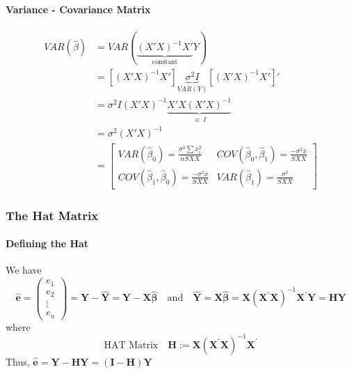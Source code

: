 \documentclass[10pt]{article}
\begin{document}
\paragraph{Variance - Covariance Matrix}
\begin{align*}
    VAR(\hat{\beta}) &= VAR( \underbrace{(X'X)^{-1}X'}_{\text{constant}}Y ) \\
    &= [(X'X)^{-1}X'] \underbrace{\sigma^2 I}_{VAR(Y)} [(X'X)^{-1}X']' \\
    &= \sigma^2 I (X'X)^{-1}  \underbrace{X'X (X'X)^{-1}}_{\equiv~I} \\
    &= \sigma^2 (X'X)^{-1} \\
    &=
    \begin{bmatrix}
        VAR(\hat{\beta}_0) =  \frac{\sigma^2\sum x_{i}^{2}}{n S X X}
        & COV(\hat{\beta}_0, \hat{\beta}_1) = \frac{-\sigma^2\bar{x}}{S X X} \\
        COV(\hat{\beta}_1, \hat{\beta}_0) = \frac{-\sigma^2\bar{x}}{S X X}
        & VAR(\hat{\beta}_1) = \frac{\sigma^2}{SXX}
    \end{bmatrix}
\end{align*}

\subsubsection{The Hat Matrix}
\paragraph{Defining the Hat}
We have
\begin{equation*}
    \widehat{\mathbf{e}}=\left(\begin{array}{c}{e_{1}} \\ {e_{2}} \\ {\vdots} \\ {e_{n}}\end{array}\right)=\mathbf{Y}-\widehat{\mathbf{Y}}=\mathbf{Y}-\mathbf{X} \widehat{\boldsymbol{\beta}} \quad \text{and} \quad  \widehat{\mathbf{Y}}=\mathbf{X} \widehat{\boldsymbol{\beta}}=\mathbf{X}\left(\mathbf{X}^{\prime} \mathbf{X}\right)^{-1} \mathbf{X}^{\prime} \mathbf{Y}=\mathbf{H} \mathbf{Y}
\end{equation*}
where
\begin{equation*}
    \text{HAT Matrix} \quad \mathbf{H} := \mathbf{X}\left(\mathbf{X}^{\prime} \mathbf{X}\right)^{-1} \mathbf{X}^{\prime}
\end{equation*}
Thus, $\widehat{\mathbf{e}}=\mathbf{Y}-\mathbf{H Y}=(\mathbf{I}-\mathbf{H}) \mathbf{Y}$
\end{document}
